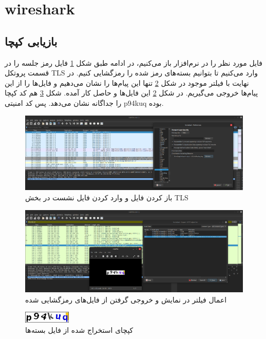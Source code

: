\documentclass[12pt]{article}
\begin{document}
	
	\section{wireshark}
	\subsection{بازیابی کپچا}
	فایل مورد نظر را در نرم‌افزار باز می‌کنیم، در ادامه طبق شکل \ref{cap:1} فایل رمز جلسه را در قسمت پروتکل TLS وارد می‌کنیم تا بتوانیم بسته‌های رمز شده را رمزگشایی کنیم. در نهایت با فیلتر موجود در شکل \ref{cap:2} تنها این پیام‌ها را نشان می‌دهیم و فایل‌ها را از این پیام‌ها خروجی می‌گیریم. در شکل \ref{cap:2} این فایل‌ها و حاصل کار آمده. شکل \ref{cap:3} هم کد کپچا را جداگانه نشان می‌دهد. پس کد امنیتی p94kuq بوده.
	 
	\begin{figure}[h]
		\centering
		\includegraphics[width=\textwidth]{resources/1.png}
		\caption{باز کردن فایل و وارد کردن فایل نشست در بخش TLS}
		\label{cap:1}
	\end{figure}
	\begin{figure}[h]
		\centering
		\includegraphics[width=\textwidth]{resources/2.png}
		\caption{اعمال فیلتر در نمایش و خروجی گرفتن از فایل‌های رمزگشایی شده}
		\label{cap:2}
	\end{figure}
	\begin{figure}[h]
		\centering
		\includegraphics[width=0.2\textwidth]{resources/captcha.png}
		\caption{کپچای استخراج شده از فایل بسته‌ها}
		\label{cap:3}
	\end{figure}
	
\end{document}
